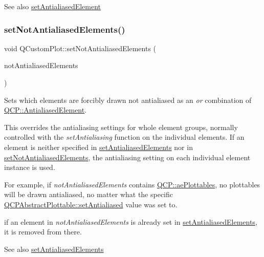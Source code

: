 \begin{DoxySeeAlso}{See also}
\hyperlink{classQCustomPlot_aeef813bcf7efab8e765f9f87ec454691}{set\+Antialiased\+Element} 
\end{DoxySeeAlso}
\mbox{\label{classQCustomPlot_ae10d685b5eabea2999fb8775ca173c24}} 
\subsubsection{\texorpdfstring{set\+Not\+Antialiased\+Elements()}{setNotAntialiasedElements()}}
{\footnotesize\ttfamily void Q\+Custom\+Plot\+::set\+Not\+Antialiased\+Elements (\begin{DoxyParamCaption}\item[{const Q\+C\+P\+::\+Antialiased\+Elements \&}]{not\+Antialiased\+Elements }\end{DoxyParamCaption})}

Sets which elements are forcibly drawn not antialiased as an {\itshape or} combination of \hyperlink{namespaceQCP_ae55dbe315d41fe80f29ba88100843a0c}{Q\+C\+P\+::\+Antialiased\+Element}.

This overrides the antialiasing settings for whole element groups, normally controlled with the {\itshape set\+Antialiasing} function on the individual elements. If an element is neither specified in \hyperlink{classQCustomPlot_af6f91e5eab1be85f67c556e98c3745e8}{set\+Antialiased\+Elements} nor in \hyperlink{classQCustomPlot_ae10d685b5eabea2999fb8775ca173c24}{set\+Not\+Antialiased\+Elements}, the antialiasing setting on each individual element instance is used.

For example, if {\itshape not\+Antialiased\+Elements} contains \hyperlink{namespaceQCP_ae55dbe315d41fe80f29ba88100843a0ca4145e4251b0cf2dbedabeea0a38f84f6}{Q\+C\+P\+::ae\+Plottables}, no plottables will be drawn antialiased, no matter what the specific \hyperlink{classQCPLayerable_a4fd43e89be4a553ead41652565ff0581}{Q\+C\+P\+Abstract\+Plottable\+::set\+Antialiased} value was set to.

if an element in {\itshape not\+Antialiased\+Elements} is already set in \hyperlink{classQCustomPlot_af6f91e5eab1be85f67c556e98c3745e8}{set\+Antialiased\+Elements}, it is removed from there.

\begin{DoxySeeAlso}{See also}
\hyperlink{classQCustomPlot_af6f91e5eab1be85f67c556e98c3745e8}{set\+Antialiased\+Elements} 
\end{DoxySeeAlso}
\mbox{\label{classQCustomPlot_a7db1adc09016329f3aef7c60da935789}} 
